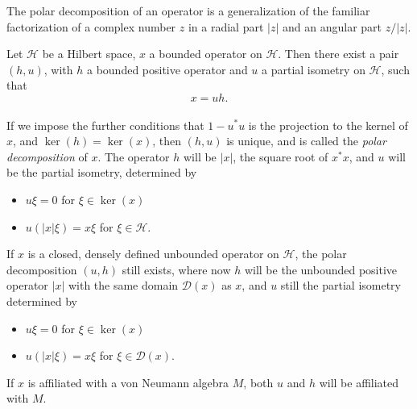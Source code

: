 \documentclass[12pt]{article}
\begin{document}
The polar decomposition of an operator is a generalization of the familiar factorization of a complex number $z$ in a radial part $|z|$ and an angular part $z/|z|$.

Let $\mathscr{H}$ be a Hilbert space, $x$ a bounded operator on $\mathscr{H}$. Then there exist a pair $(h,u)$, with $h$ a bounded positive operator and $u$ a partial isometry on $\mathscr{H}$, such that \[x=uh.\]\\ 

If we impose the further conditions that $1-u^*u$ is the projection to the kernel of $x$, and $\ker(h)=\ker(x)$, then $(h,u)$ is unique, and is called the \emph{polar decomposition} of $x$. The operator $h$ will be $|x|$, the square root of $x^*x$, and $u$ will be the partial isometry, determined by \begin{itemize} \item $u\xi=0$ for $\xi \in \ker(x)$ \item $u(|x|\xi)=x\xi$ for $\xi\in \mathscr{H}$. \end{itemize}

If $x$ is a closed, densely defined unbounded operator on $\mathscr{H}$, the polar decomposition $(u,h)$ still exists, where now $h$ will be the unbounded positive operator $|x|$ with the same domain $\mathscr{D}(x)$ as $x$, and $u$ still the partial isometry determined by \begin{itemize} \item $u\xi=0$ for $\xi \in \ker(x)$ \item $u(|x|\xi)=x\xi$ for $\xi\in \mathscr{D}(x)$. \end{itemize}

If $x$ is affiliated with a von Neumann algebra $M$, both $u$ and $h$ will be affiliated with $M$.
\end{document}
